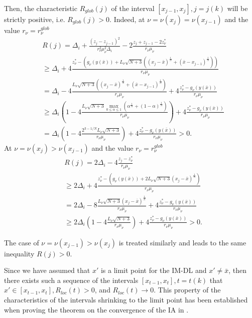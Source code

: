 \documentclass[twocolumn]{svjour3}          %
\begin{document}
	Then, the characteristic $R_{glob}(j)$ of the interval $[x_{j-1}, x_j], j=j(k)$ will be strictly positive, i.e. $R_{glob}(j)>0$. Indeed, at $\nu=\nu(x_j)=\nu(x_{j-1})$ and the value $r_{\nu}=r_{\nu}^{glob}$
\begin{align*}
	& R(j) = \Delta_i + \frac{(z_j-z_{j-1})^2}{r_{\nu}^2\mu_{\nu}^2\Delta_i} - 2\frac{z_j+z_{j-1}-2z_{\nu}^{\ast}}{r_{\nu}\mu_{\nu}} \\
	& \geq \Delta_i + 4\frac{z_{\nu}^*-\left( g_{\nu}\left( y(\bar x) \right)+L_{\nu}\sqrt{N+3}\left( (x_j-\bar x)^{\frac{1}{N}}+(\bar x - x_{j-1})^{\frac{1}{N}} \right)\right)}{r_{\nu}\mu_{\nu}} \\
	& = \Delta_i-4\frac{L_{\nu}\sqrt{N+3}\left( (x_j-\bar x)^{\frac{1}{N}}+(\bar x - x_{j-1})^{\frac{1}{N}} \right)}{r_{\nu}\mu_{\nu}}+4\frac{z_{\nu}^\ast-g_{\nu}\left( y(\bar x) \right)}{r_{\nu}\mu_{\nu}} \\
	& \geq \Delta_i\left(1-4\frac{L_{\nu}\sqrt{N+3}\max_{0\leq\alpha\leq1} {\left( \alpha^{\frac{1}{N}}+(1-\alpha)^{\frac{1}{N}} \right)}}{r_{\nu}\mu_{\nu}} \right)+4\frac{z_{\nu}^{\ast}-g_{\nu}\left( y(\bar x) \right)}{r_{\nu}\mu_{\nu}} \\
	& = \Delta_i\left(1-4\frac{2^{3-1/N}L_{\nu}\sqrt{N+3}}{r_{\nu}\mu_{\nu}} \right)+4\frac{z_{\nu}^{\ast}-g_{\nu}\left( y(\bar x) \right)}{r_{\nu}\mu_{\nu}} > 0.
\end{align*}
At $\nu=\nu(x_j ) > \nu(x_{j-1})$ and the value $r_{\nu}=r_{\nu}^{glob}$
\begin{align*}
	& R(j) = 2\Delta_i - 4\frac{z_j-z_{\nu}^{\ast}}{r_{\nu}\mu_{\nu}} \\
	& \geq 2\Delta_i+4\frac{z_{\nu}^{\ast}-\left( g_{\nu}\left(y(\bar x)\right)+2L_{\nu}\sqrt{N+3}(x_j-\bar x)^{\frac{1}{N}} \right)}{r_{\nu}\mu_{\nu}} \\
	& = 2\Delta_i - 8\frac{L_{\nu}\sqrt{N+3}(x_j-\bar x)^{\frac{1}{N}}}{r_{\nu}\mu_{\nu}}+4\frac{z_{\nu}^{\ast}-g_{\nu}\left( y(\bar x) \right)}{r_{\nu}\mu_{\nu}} \\
	& \geq 2\Delta_i\left( 1-4\frac{L_{\nu}\sqrt{N+3}}{r_{\nu}\mu_{\nu}} \right) + 4\frac{z_{\nu}^{\ast}-g_{\nu}\left( y(\bar x) \right)}{r_{\nu}\mu_{\nu}} > 0.
\end{align*}

	The case of $\nu=\nu(x_{j-1})>\nu(x_j)$ is treated similarly and leads to the same inequality $R(j)>0$.

	Since we have assumed that $x'$ is a limit point for the IM-DL and  $x' \neq \bar x$, then there exists such a sequence of the intervals $[x_{t-1}, x_t], t=t(k)$ that $x' \in [x_{t-1}, x_t], R_{loc}(t)>0$, and $R_{loc}(t) \rightarrow 0$. This property of the characteristics of the intervals shrinking to the limit point has been established when proving the theorem on the convergence of the IA in \cite{Sergeyev2013}.
\end{document}
